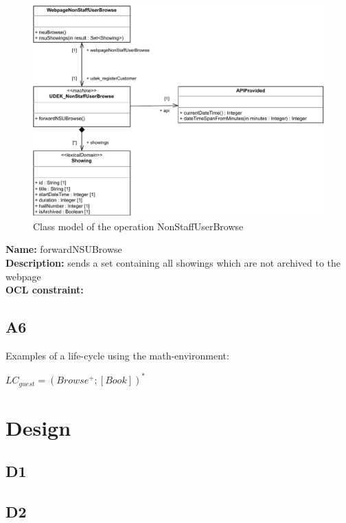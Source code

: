 \documentclass[a4paper,10pt,titlepage,bibtotoc,bibtotocnumbered]{scrreprt}
\begin{document}
\begin{figure}[H]
    \centering
    \includegraphics[width = \textwidth]{figures/06/a06_class_diagram_NonStaffUserBrowse.pdf}
    \caption{Class model of the operation NonStaffUserBrowse}
    \label{figure:operation_NonStaffUserBrowse_class_diagram}
\end{figure}

\textbf{Name:} forwardNSUBrowse
\\
\textbf{Description:} sends a set containing all showings which are not archived to the webpage
\\
\textbf{OCL constraint:}



\newpage\section{A6}

Examples of a life-cycle using the math-environment:

$LC_{guest}=(Browse^+;[Book])^*$



\chapter{Design}

\section{D1}

\section{D2}
\end{document}
